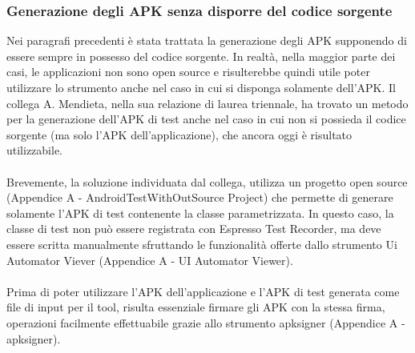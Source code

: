 \subsubsection*{Generazione degli APK senza disporre del codice sorgente}
\label{genapknocod}
Nei paragrafi precedenti è stata trattata la generazione degli APK supponendo di essere sempre in possesso del codice sorgente. In realtà, nella maggior parte dei casi, le applicazioni non sono open source e risulterebbe quindi utile poter utilizzare lo strumento anche nel caso in cui si disponga solamente dell'APK.  Il collega A. Mendieta, nella sua relazione di laurea triennale, ha trovato un metodo per la generazione dell'APK di test anche nel caso in cui non si possieda il codice sorgente (ma solo l'APK dell'applicazione), che ancora oggi è risultato utilizzabile.
\\\\
\noindent Brevemente, la soluzione individuata dal collega, utilizza un progetto open source (Appendice A - AndroidTestWithOutSource Project) che permette di generare solamente l'APK di test contenente la classe parametrizzata. In questo caso, la classe di test non può essere registrata con Espresso Test Recorder, ma deve essere scritta manualmente sfruttando le funzionalità offerte dallo strumento Ui Automator Viever (Appendice A - UI Automator Viewer). 
\\\\
\noindent Prima di poter utilizzare l'APK dell'applicazione e l'APK di test generata come file di input per il tool, risulta essenziale firmare gli APK con la stessa firma, operazioni facilmente effettuabile grazie allo strumento apksigner (Appendice A - apksigner).


